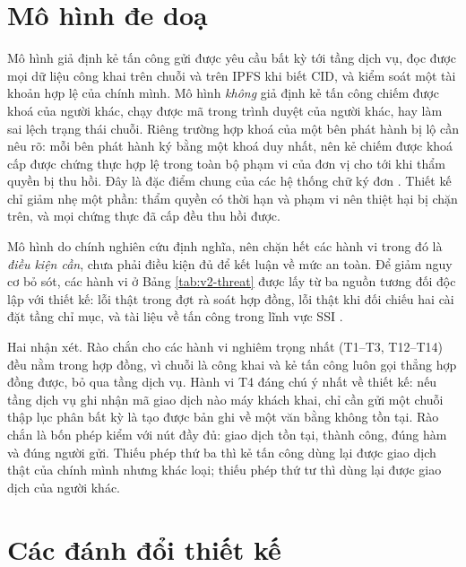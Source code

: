 

\section{Mô hình đe doạ}
\label{sec:de-doa}

Mô hình giả định kẻ tấn công gửi được yêu cầu bất kỳ tới tầng dịch vụ, đọc được mọi dữ liệu công khai trên chuỗi và trên IPFS khi biết CID, và kiểm soát một tài khoản hợp lệ của chính mình. Mô hình \emph{không} giả định kẻ tấn công chiếm được khoá của người khác, chạy được mã trong trình duyệt của người khác, hay làm sai lệch trạng thái chuỗi. Riêng trường hợp khoá của một bên phát hành bị lộ cần nêu rõ: mỗi bên phát hành ký bằng một khoá duy nhất, nên kẻ chiếm được khoá cấp được chứng thực hợp lệ trong toàn bộ phạm vi của đơn vị cho tới khi thẩm quyền bị thu hồi. Đây là đặc điểm chung của các hệ thống chữ ký đơn \cite{Saramago2021}. Thiết kế chỉ giảm nhẹ một phần: thẩm quyền có thời hạn và phạm vi nên thiệt hại bị chặn trên, và mọi chứng thực đã cấp đều thu hồi được.

Mô hình do chính nghiên cứu định nghĩa, nên chặn hết các hành vi trong đó là \emph{điều kiện cần}, chưa phải điều kiện đủ để kết luận về mức an toàn. Để giảm nguy cơ bỏ sót, các hành vi ở Bảng \ref{tab:v2-threat} được lấy từ ba nguồn tương đối độc lập với thiết kế: lỗi thật trong đợt rà soát hợp đồng, lỗi thật khi đối chiếu hai cài đặt tầng chỉ mục, và tài liệu về tấn công trong lĩnh vực SSI \cite{Krul2024, Ambati2026}.



Hai nhận xét. Rào chắn cho các hành vi nghiêm trọng nhất (T1--T3, T12--T14) đều nằm trong hợp đồng, vì chuỗi là công khai và kẻ tấn công luôn gọi thẳng hợp đồng được, bỏ qua tầng dịch vụ. Hành vi T4 đáng chú ý nhất về thiết kế: nếu tầng dịch vụ ghi nhận mã giao dịch nào máy khách khai, chỉ cần gửi một chuỗi thập lục phân bất kỳ là tạo được bản ghi về một văn bằng không tồn tại. Rào chắn là bốn phép kiểm với nút đầy đủ: giao dịch tồn tại, thành công, đúng hàm và đúng người gửi. Thiếu phép thứ ba thì kẻ tấn công dùng lại được giao dịch thật của chính mình nhưng khác loại; thiếu phép thứ tư thì dùng lại được giao dịch của người khác.

\section{Các đánh đổi thiết kế}
\label{sec:danh-doi}


